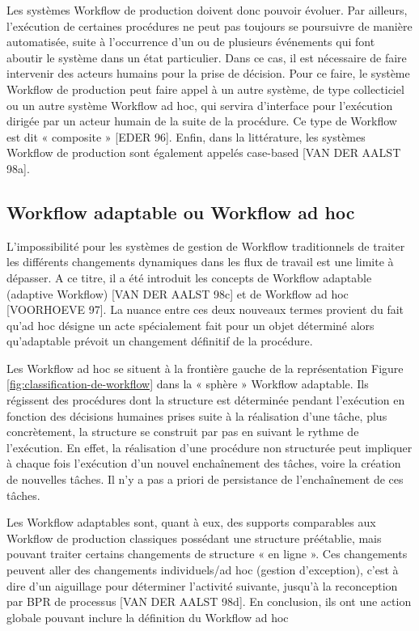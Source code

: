 Les systèmes Workflow de production doivent donc pouvoir évoluer. Par ailleurs,
l’exécution de certaines procédures ne peut pas toujours se poursuivre de manière automatisée, suite à l’occurrence d’un ou de plusieurs événements qui font aboutir le système dans un
état particulier. Dans ce cas, il est nécessaire de faire intervenir des acteurs humains pour la
prise de décision. Pour ce faire, le système Workflow de production peut faire appel à un autre système, de type collecticiel ou un autre système Workflow ad hoc, qui servira d’interface
pour l’exécution dirigée par un acteur humain de la suite de la procédure. Ce type de Workflow est dit « composite » [EDER 96]. Enfin, dans la littérature, les systèmes Workflow de
production sont également appelés case-based [VAN DER AALST 98a]. 

\subsection{Workflow adaptable ou Workflow ad hoc }
L’impossibilité pour les systèmes de gestion de Workflow traditionnels de traiter les différents changements dynamiques dans les flux de travail est une limite à dépasser. A ce titre, il a été introduit les concepts de Workflow adaptable (adaptive Workflow) [VAN DER
AALST 98c] et de Workflow ad hoc [VOORHOEVE 97]. La nuance entre ces deux nouveaux termes provient du fait qu’ad hoc désigne un acte spécialement fait pour un objet déterminé alors qu’adaptable prévoit un changement définitif de la procédure. 

Les Workflow ad hoc se situent à la frontière gauche de la représentation Figure \ref{fig:classification-de-workflow} dans
la « sphère » Workflow adaptable. Ils régissent des procédures dont la structure est déterminée pendant l’exécution en fonction des décisions humaines prises suite à la réalisation d’une
tâche, plus concrètement, la structure se construit par pas en suivant le rythme de l’exécution. En effet, la réalisation d’une procédure non structurée peut impliquer à chaque fois l’exécution d’un nouvel enchaînement des tâches, voire la création de nouvelles tâches. Il n’y a pas a priori de persistance de l’enchaînement de ces tâches.

Les Workflow adaptables sont, quant à eux, des supports comparables aux Workflow de
production classiques possédant une structure préétablie, mais pouvant traiter certains changements de structure « en ligne ». Ces changements peuvent aller des changements individuels/ad hoc (gestion d’exception), c’est à dire d’un aiguillage pour déterminer l’activité suivante, jusqu'à la reconception par BPR de processus [VAN DER AALST 98d]. En conclusion, ils ont une action globale pouvant inclure la définition du Workflow ad hoc  

